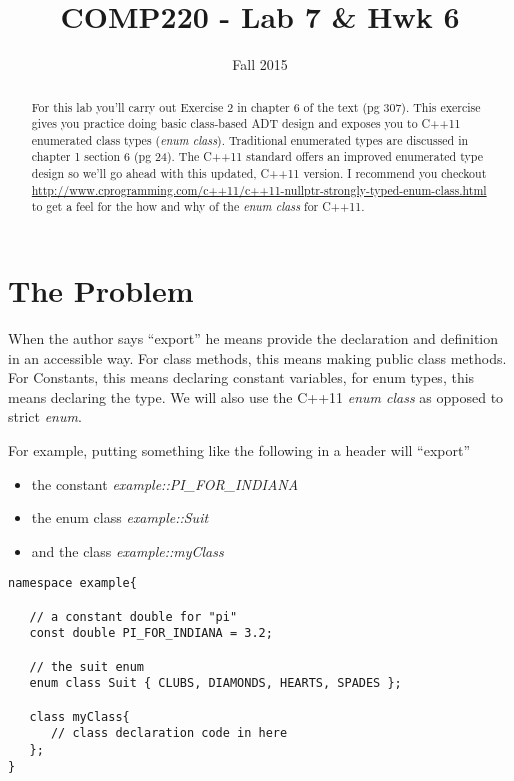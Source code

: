 \documentclass[10pt]{article}
\title{COMP220 - Lab 7 \& Hwk 6}
\author{ }
\date{Fall 2015}
\begin{document}
\maketitle

\begin{abstract}
For this lab you'll carry out Exercise 2 in chapter 6 of the text (pg 307). This exercise gives you practice doing basic class-based ADT design and exposes you to C++11 enumerated class types (\textit{enum class}). Traditional enumerated types are discussed in chapter 1 section 6 (pg 24).  The C++11 standard offers an improved enumerated type design so we'll go ahead with this updated, C++11 version. I recommend you checkout \url{http://www.cprogramming.com/c++11/c++11-nullptr-strongly-typed-enum-class.html} to get a feel for the how and why of the \textit{enum class} for C++11.
\end{abstract}

\section{The Problem}

When the author says ``export'' he means provide the declaration and definition in an accessible way. For class methods, this means making public class methods. For Constants, this means declaring constant variables, for enum types, this means declaring the type. We will also use the C++11 \textit{enum class} as opposed to strict \textit{enum}. 


For example, putting something like the following in a header will ``export'' 
\begin{itemize}
\item the constant \textit{example::PI\_FOR\_INDIANA}
\item the enum class \textit{example::Suit}
\item and the class \textit{example::myClass}
\end{itemize}

\begin{verbatim}
namespace example{

   // a constant double for "pi"
   const double PI_FOR_INDIANA = 3.2;
	
   // the suit enum
   enum class Suit { CLUBS, DIAMONDS, HEARTS, SPADES };
	
   class myClass{
      // class declaration code in here	
   };
}
\end{verbatim}
\end{document}
